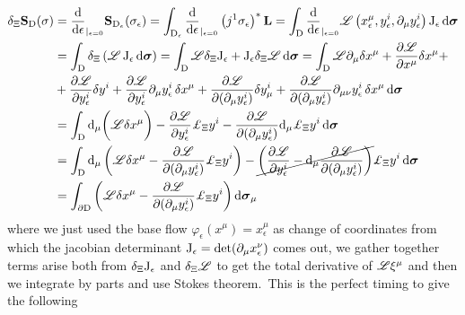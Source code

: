 \begin{align*}
    \delta_\Xi\mathbf{S}_{\Dd}(\sigma)&={\frac{\d}{\d\epsilon}}_{|_{\epsilon=0}}\mathbf{S}_{\Dd_\epsilon}(\sigma_\epsilon)=\int_{\Dd_\epsilon}{\frac{\d}{\d\epsilon}}_{|_{\epsilon=0}}\left(j^1\sigma_\epsilon\right)^*\mathbf{L}=\int_\Dd{\frac{\d}{\d\epsilon}}_{|_{\epsilon=0}}\L\left(x^\mu_\epsilon,y^i_\epsilon,\der_\mu y^i_\epsilon\right)\J_\epsilon\,\d\boldsymbol{\sigma}\\
    &=\int_\Dd\delta_\Xi\left(\L\,\J_\epsilon\,\d\boldsymbol{\sigma}\right)=\int_\Dd\L\delta_\Xi\J_\epsilon+\J_\epsilon\delta_\Xi\L\,\d\boldsymbol{\sigma}=\int_\Dd\L\der_\mu\delta x^\mu+\frac{\der\L}{\der x^\mu}\delta x^\mu+\\
    &+\frac{\der\L}{\der y^i_\epsilon}\delta y^i+\frac{\der\L}{\der y^i_\epsilon}\der_\mu y^i_\epsilon\,\delta x^\mu+\frac{\der\L}{\der(\der_\mu y^i_\epsilon)}\delta y^i_\mu+\frac{\der\L}{\der(\der_\mu y^i_\epsilon)}\der_{\mu\nu}y^i_\epsilon\,\delta x^\mu\,\d\boldsymbol{\sigma}\\
    &=\int_\Dd\d_\mu\bigg(\L\delta x^\mu\bigg)-\frac{\der\L}{\der y^i_\epsilon}\pounds_\Xi y^i-\frac{\der\L}{\der(\der_\mu y^i_\epsilon)}\d_\mu\pounds_\Xi y^i\,\d\boldsymbol{\sigma}\\
    &=\int_\Dd\d_\mu\left(\L\delta x^\mu-\frac{\der\L}{\der(\der_\mu y^i_\epsilon)}\pounds_\Xi y^i\right)-\cancel{\left(\frac{\der\L}{\der y^i_\epsilon}-\d_\mu\frac{\der\L}{\der(\der_\mu y^i_\epsilon)}\right)}\pounds_\Xi y^i\,\d\boldsymbol{\sigma}\\
    &=\int_{\der\Dd}\left(\L\delta x^\mu-\frac{\der\L}{\der(\der_\mu y^i_\epsilon)}\pounds_\Xi y^i\right)\d\boldsymbol{\sigma}_\mu
\end{align*} 
where we just used the base flow $\varphi_\epsilon(x^\mu)=x^\mu_\epsilon$ as change of coordinates from which the jacobian determinant $\text{\normalfont J}_\epsilon=\det(\partial_\mu x^\nu_\epsilon)$ comes out, we gather together terms arise both from $\delta_\Xi\text{\normalfont J}_\epsilon$ and $\delta_\Xi\mathscr{L}$ to get the total derivative of $\mathscr{L}\xi^\mu$ and then we integrate by parts and use Stokes theorem.\, This is the perfect timing to give the following

